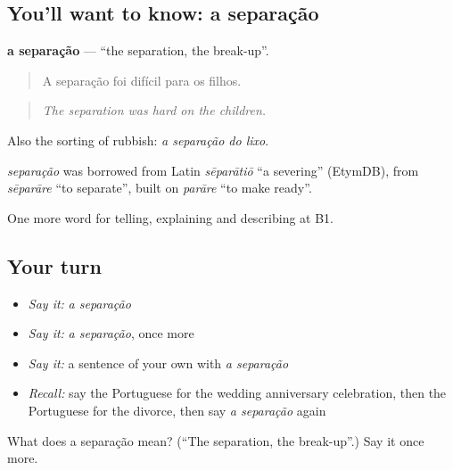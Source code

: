 \subsection*{You'll want to know: a separação}
\textbf{a separação} — \textquotedblleft{}the separation, the break-up\textquotedblright{}.

\begin{quote}
A separação foi difícil para os filhos.
\end{quote}

\begin{quote}
\emph{The separation was hard on the children.}
\end{quote}

Also the sorting of rubbish: \emph{a separação do lixo}.

\begin{cousinweb}
\emph{separação} was borrowed from Latin \emph{sēparātiō} \textquotedblleft{}a severing\textquotedblright{} (EtymDB), from \emph{sēparāre} \textquotedblleft{}to separate\textquotedblright{}, built on \emph{parāre} \textquotedblleft{}to make ready\textquotedblright{}.
\end{cousinweb}

\begin{grammarlens}[title={What you've built}]
One more word for telling, explaining and describing at B1.
\end{grammarlens}

\subsection*{Your turn}
\begin{itemize}
\raggedright
  \item \emph{Say it:} \emph{a separação}
  \item \emph{Say it:} \emph{a separação}, once more
  \item \emph{Say it:} a sentence of your own with \emph{a separação}
  \item \emph{Recall:} say the Portuguese for the wedding anniversary celebration, then the Portuguese for the divorce, then say \emph{a separação} again
\end{itemize}

\begin{tcolorbox}[breakable,colback=teal!4,colframe=teal!35!black,title={Before you move on}]
What does a separação mean? (\textquotedblleft{}The separation, the break-up\textquotedblright{}.) Say it once more.
\end{tcolorbox}
